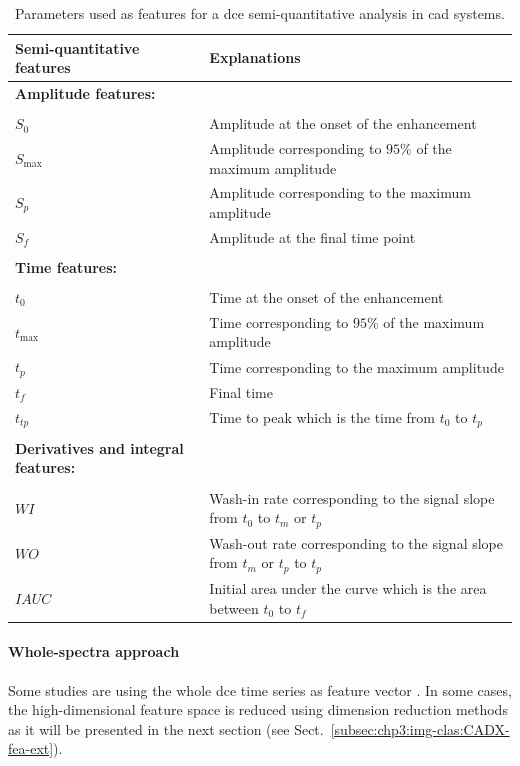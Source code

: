 \begin{table}
  \caption{Parameters used as features for a \acs*{dce} semi-quantitative analysis in \acs*{cad} systems.}
  \scriptsize
  \centering
  \begin{tabularx}{\textwidth}{l X}
    \toprule
    \textbf{Semi-quantitative features} & \textbf{Explanations} \\
    \midrule
    \textbf{Amplitude features:} & \\ \\ [-1.5ex]
    \quad $S_0$ & Amplitude at the onset of the enhancement \\
    \quad $S_{\max}$ & Amplitude corresponding to $95\%$ of the maximum amplitude \\
    \quad $S_{p}$ & Amplitude corresponding to the maximum amplitude \\
    \quad $S_f$ & Amplitude at the final time point \\ \\ [-1.5ex]
    \textbf{Time features:} & \\ \\ [-1.5ex]
    \quad $t_0$ & Time at the onset of the enhancement \\
    \quad $t_{\max}$ & Time corresponding to $95\%$ of the maximum amplitude \\
    \quad $t_{p}$ & Time corresponding to the maximum amplitude \\
    \quad $t_{f}$ & Final time \\
    \quad $t_{tp}$ & Time to peak which is the time from $t_0$ to $t_p$ \\ \\ [-1.5ex]
    \textbf{Derivatives and integral features:} & \\ \\ [-1.5ex]
    \quad $WI$ & Wash-in rate corresponding to the signal slope from $t_0$ to $t_m$ or $t_p$ \\
    \quad $WO$ & Wash-out rate corresponding to the signal slope from $t_m$ or $t_p$ to $t_p$ \\
    \quad $IAUC$ & Initial area under the curve which is the area between $t_0$ to $t_{f}$ \\
    \bottomrule
  \end{tabularx}
\label{tab:semiqua}
\end{table}


\paragraph{Whole-spectra approach}
Some studies are using the whole \ac{dce} time series as feature vector \cite{Ampeliotis2007,Ampeliotis2008,Tiwari2012,Viswanath2008a,Viswanath2008}.
In some cases, the high-dimensional feature space is reduced using dimension reduction methods as it will be presented in the next section (see Sect.~\ref{subsec:chp3:img-clas:CADX-fea-ext}).

